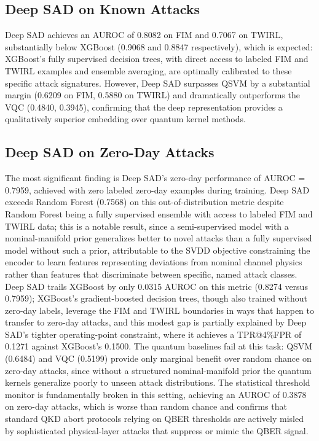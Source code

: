 \documentclass[12pt, a4paper]{report}
\begin{document}
\subsection{Deep SAD on Known Attacks}
Deep SAD achieves an AUROC of 0.8082 on FIM and 0.7067 on TWIRL, substantially below XGBoost (0.9068 and 0.8847 respectively), which is expected: XGBoost's fully supervised decision trees, with direct access to labeled FIM and TWIRL examples and ensemble averaging, are optimally calibrated to these specific attack signatures. However, Deep SAD surpasses QSVM by a substantial margin (0.6209 on FIM, 0.5880 on TWIRL) and dramatically outperforms the VQC (0.4840, 0.3945), confirming that the deep representation provides a qualitatively superior embedding over quantum kernel methods.

\subsection{Deep SAD on Zero-Day Attacks}
The most significant finding is Deep SAD's zero-day performance of AUROC = 0.7959, achieved with zero labeled zero-day examples during training. Deep SAD exceeds Random Forest (0.7568) on this out-of-distribution metric despite Random Forest being a fully supervised ensemble with access to labeled FIM and TWIRL data; this is a notable result, since a semi-supervised model with a nominal-manifold prior generalizes better to novel attacks than a fully supervised model without such a prior, attributable to the SVDD objective constraining the encoder to learn features representing deviations from nominal channel physics rather than features that discriminate between specific, named attack classes. Deep SAD trails XGBoost by only 0.0315 AUROC on this metric (0.8274 versus 0.7959); XGBoost's gradient-boosted decision trees, though also trained without zero-day labels, leverage the FIM and TWIRL boundaries in ways that happen to transfer to zero-day attacks, and this modest gap is partially explained by Deep SAD's tighter operating-point constraint, where it achieves a TPR@4\%FPR of 0.1271 against XGBoost's 0.1500. The quantum baselines fail at this task: QSVM (0.6484) and VQC (0.5199) provide only marginal benefit over random chance on zero-day attacks, since without a structured nominal-manifold prior the quantum kernels generalize poorly to unseen attack distributions. The statistical threshold monitor is fundamentally broken in this setting, achieving an AUROC of 0.3878 on zero-day attacks, which is worse than random chance and confirms that standard QKD abort protocols relying on QBER thresholds are actively misled by sophisticated physical-layer attacks that suppress or mimic the QBER signal.
\end{document}
